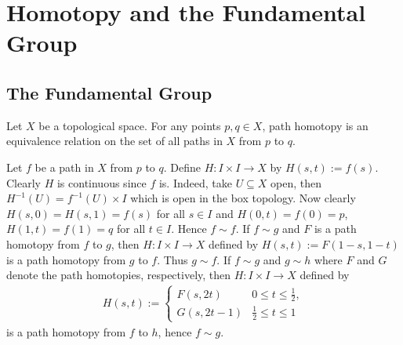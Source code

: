 \chapter{Homotopy and the Fundamental Group}
\section{The Fundamental Group}
\begin{exercise}
Let $X$ be a topological space. For any points $p,q \in X$, path homotopy is an equivalence relation on the set of all paths in $X$ from $p$ to $q$.
\end{exercise}

\begin{solution}
Let $f$ be a path in $X$ from $p$ to $q$. Define $H: I \times I \to X$ by $H(s,t) := f(s)$. Clearly $H$ is continuous since $f$ is. Indeed, take $U \subseteq X$ open, then $H^{-1}(U) = f^{-1}(U) \times I$ which is open in the box topology. Now clearly $H(s,0) = H(s,1) = f(s)$ for all $s \in I$ and $H(0,t) = f(0) = p$, $H(1,t) = f(1) = q$ for all $t \in I$. Hence $f \sim f$. If $f \sim g$ and $F$ is a path homotopy from $f$ to $g$, then $H: I \times I \to X$ defined by $H(s,t) := F(1-s,1-t)$ is a path homotopy from $g$ to $f$. Thus $g \sim f$. If $f \sim g$ and $g \sim h$ where $F$ and $G$ denote the path homotopies, respectively, then $H: I \times I \to X$ defined by
\begin{align*}
H(s,t) := \begin{cases}
F(s,2t) & 0 \leq t \leq \frac{1}{2},\\
G(s,2t - 1) & \frac{1}{2} \leq t \leq 1
\end{cases}
\end{align*}
\noindent is a path homotopy from $f$ to $h$, hence $f \sim g$.
\end{solution}
